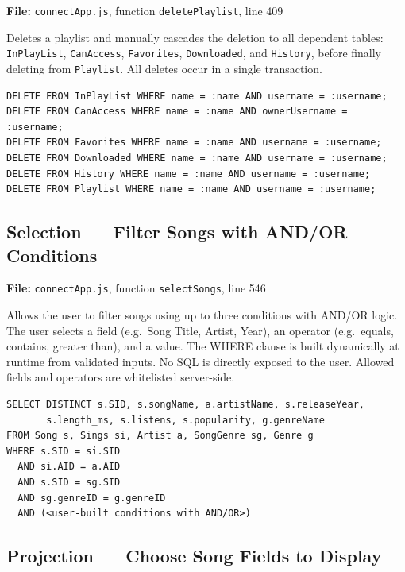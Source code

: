 \documentclass{article}
\begin{document}
\textbf{File:} \texttt{connectApp.js}, function \texttt{deletePlaylist}, line 409

Deletes a playlist and manually cascades the deletion to all dependent tables:
\texttt{InPlayList}, \texttt{CanAccess}, \texttt{Favorites},
\texttt{Downloaded}, and \texttt{History}, before finally deleting from
\texttt{Playlist}. All deletes occur in a single transaction.

\begin{lstlisting}
DELETE FROM InPlayList WHERE name = :name AND username = :username;
DELETE FROM CanAccess WHERE name = :name AND ownerUsername = :username;
DELETE FROM Favorites WHERE name = :name AND username = :username;
DELETE FROM Downloaded WHERE name = :name AND username = :username;
DELETE FROM History WHERE name = :name AND username = :username;
DELETE FROM Playlist WHERE name = :name AND username = :username;
\end{lstlisting}

\subsection{Selection --- Filter Songs with AND/OR Conditions}

\textbf{File:} \texttt{connectApp.js}, function \texttt{selectSongs}, line 546

Allows the user to filter songs using up to three conditions with AND/OR logic.
The user selects a field (e.g.\ Song Title, Artist, Year), an operator
(e.g.\ equals, contains, greater than), and a value. The WHERE clause is built
dynamically at runtime from validated inputs. No SQL is directly exposed to the
user. Allowed fields and operators are whitelisted server-side.

\begin{lstlisting}
SELECT DISTINCT s.SID, s.songName, a.artistName, s.releaseYear,
       s.length_ms, s.listens, s.popularity, g.genreName
FROM Song s, Sings si, Artist a, SongGenre sg, Genre g
WHERE s.SID = si.SID
  AND si.AID = a.AID
  AND s.SID = sg.SID
  AND sg.genreID = g.genreID
  AND (<user-built conditions with AND/OR>)
\end{lstlisting}

\subsection{Projection --- Choose Song Fields to Display}
\end{document}
